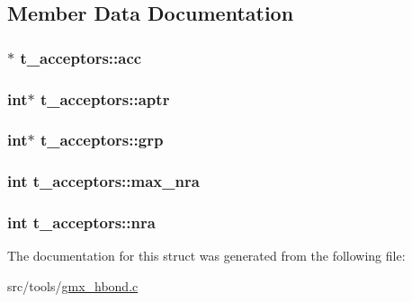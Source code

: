 \subsection{\-Member \-Data \-Documentation}
\hypertarget{structt__acceptors_a300ca21ac37b9164a73bd0453d2040df}{
\subsubsection[{acc}]{$\ast$ {\bf t\-\_\-acceptors\-::acc}}}\label{structt__acceptors_a300ca21ac37b9164a73bd0453d2040df}
\hypertarget{structt__acceptors_a1c8f13bd940a7aee4325931628f88a44}{
\subsubsection[{aptr}]{\setlength{\rightskip}{0pt plus 5cm}int$\ast$ {\bf t\-\_\-acceptors\-::aptr}}}\label{structt__acceptors_a1c8f13bd940a7aee4325931628f88a44}
\hypertarget{structt__acceptors_aea20b28ad9770d062a72a01a40022768}{
\subsubsection[{grp}]{\setlength{\rightskip}{0pt plus 5cm}int$\ast$ {\bf t\-\_\-acceptors\-::grp}}}\label{structt__acceptors_aea20b28ad9770d062a72a01a40022768}
\hypertarget{structt__acceptors_af8ea1c91a8932392c4589dddc3f7f145}{
\subsubsection[{max\-\_\-nra}]{\setlength{\rightskip}{0pt plus 5cm}int {\bf t\-\_\-acceptors\-::max\-\_\-nra}}}\label{structt__acceptors_af8ea1c91a8932392c4589dddc3f7f145}
\hypertarget{structt__acceptors_aa700a6bad469756e89f82ba39fa171cb}{
\subsubsection[{nra}]{\setlength{\rightskip}{0pt plus 5cm}int {\bf t\-\_\-acceptors\-::nra}}}\label{structt__acceptors_aa700a6bad469756e89f82ba39fa171cb}


\-The documentation for this struct was generated from the following file\-:\begin{DoxyCompactItemize}
\item 
src/tools/\hyperlink{gmx__hbond_8c}{gmx\-\_\-hbond.\-c}\end{DoxyCompactItemize}
